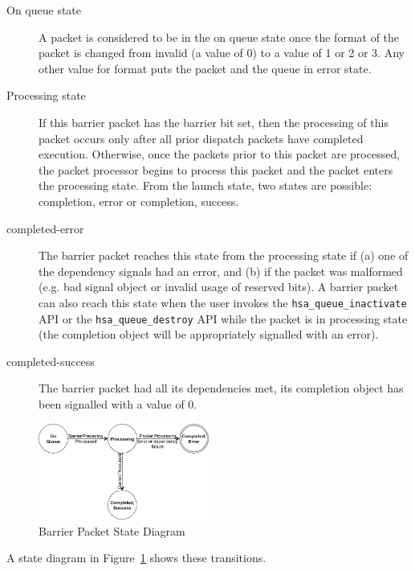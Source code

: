 \documentclass{book}
\begin{document}
\begin{description}

\item[On queue state] A packet is considered to be in the on queue
state once the format of the packet is changed from invalid (a value
of 0) to a value of 1 or 2 or 3. Any other value for format puts the
packet and the queue in error state.

\item[Processing state] If this barrier packet has the barrier bit set,
then the processing of this packet occurs only after all prior
dispatch packets have completed execution.  Otherwise, once the
packets prior to this packet are processed, the packet processor
begins to process this packet and the packet enters the processing
state.  From the launch state, two states are possible: completion,
error or completion, success.

\item[completed-error] The barrier packet reaches this state from
the processing state if (a) one of the dependency signals had an
error, and (b) if the packet was malformed (e.g. bad signal object
or invalid usage of reserved bits). A barrier packet can also reach
this state when the user invokes the \texttt{hsa\_queue\_inactivate}
API or the \texttt{hsa\_queue\_destroy} API while the packet is in
processing state (the completion object will be appropriately
signalled with an error).

\item[completed-success] The barrier packet had all its dependencies
met, its completion object has been signalled with a value of 0.

\end{description}

\begin{figure}
  \centering
  \includegraphics[width=0.5\textwidth] {fig/barrierpacketstate}
  \centering
  \caption{Barrier Packet State Diagram}
  \label{fig:barrierpacketstate}
\end{figure}

A state diagram in Figure~\ref{fig:barrierpacketstate} shows these
transitions.
\end{document}
